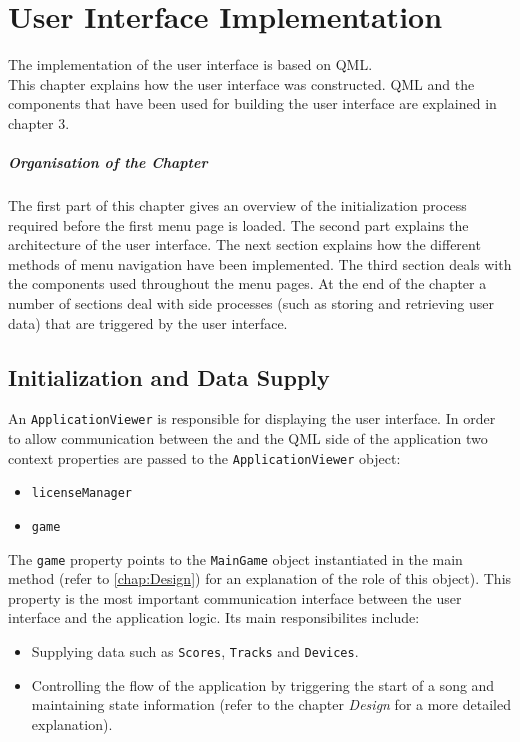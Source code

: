 \chapter[User Interface Implementation \textsuperscript{Novotny}]{User Interface Implementation}
\label{chap:UI}
The implementation of the user interface is based on QML. \\
This chapter explains how the user interface was constructed. QML and the components that have been used for building the user interface are explained in chapter 3.
\paragraph{Organisation of the Chapter} The first part of this chapter gives an overview of the initialization process required before the first menu page is loaded. The second part explains the architecture of the user interface. The next section explains how the different methods of menu navigation have been implemented. The third section deals with the components used throughout the menu pages. At the end of the chapter a number of sections deal with side processes (such as storing and retrieving user data) that are triggered by the user interface.
\section{Initialization and Data Supply}
An {\tt ApplicationViewer} is responsible for displaying the user interface.
In order to allow communication between the \cpp and the QML side of the application two context properties are passed to the {\tt ApplicationViewer} object:

\begin{itemize}
	\item{{\tt licenseManager}}
	\item{{\tt game}}
\end{itemize}

The {\tt game} property points to the {\tt MainGame} object instantiated in the main method (refer to \ref{chap:Design}) for an explanation of the role of this object). This property is the most important communication interface between the user interface and the application logic.
Its main responsibilites include:
\begin {itemize}
	\item {Supplying data such as {\tt Scores}, {\tt Tracks} and {\tt Devices}.}
	\item {Controlling the flow of the application by triggering the start of a song and maintaining state information (refer to the chapter \textit{Design} for a more detailed explanation).}
\end {itemize}

